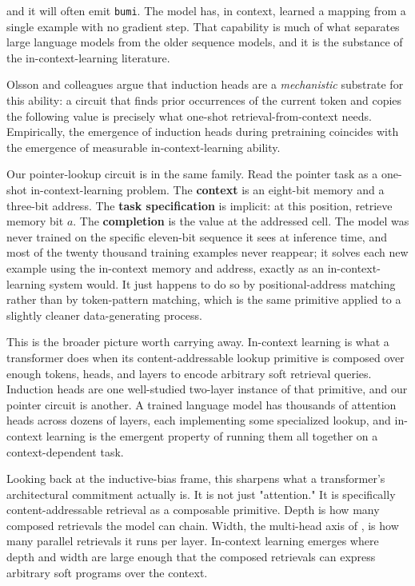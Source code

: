 and it will often emit \texttt{bumi}. The model has, in context, learned a
mapping from a single example with no gradient step. That capability is much of
what separates large language models from the older sequence models, and it is
the substance of the in-context-learning literature.

Olsson and colleagues argue that induction heads are a \emph{mechanistic}
substrate for this ability: a circuit that finds prior occurrences of the current
token and copies the following value is precisely what one-shot
retrieval-from-context needs. Empirically, the emergence of induction heads
during pretraining coincides with the emergence of measurable in-context-learning
ability.

Our pointer-lookup circuit is in the same family. Read the pointer task as a
one-shot in-context-learning problem. The \textbf{context} is an eight-bit memory
and a three-bit address. The \textbf{task specification} is implicit: at this
position, retrieve memory bit $a$. The \textbf{completion} is the value at the
addressed cell. The model was never trained on the specific eleven-bit sequence
it sees at inference time, and most of the twenty thousand training examples
never reappear; it solves each new example using the in-context memory and
address, exactly as an in-context-learning system would. It just happens to do so
by positional-address matching rather than by token-pattern matching, which is
the same primitive applied to a slightly cleaner data-generating process.

This is the broader picture worth carrying away. In-context learning is what a
transformer does when its content-addressable lookup primitive is composed over
enough tokens, heads, and layers to encode arbitrary soft retrieval queries.
Induction heads are one well-studied two-layer instance of that primitive, and
our pointer circuit is another. A trained language model has thousands of
attention heads across dozens of layers, each implementing some specialized
lookup, and in-context learning is the emergent property of running them all
together on a context-dependent task.

Looking back at the inductive-bias frame, this sharpens what a transformer's
architectural commitment actually is. It is not just "attention." It is
specifically content-addressable retrieval as a composable primitive. Depth is
how many composed retrievals the model can chain. Width, the multi-head axis of
, is how many parallel retrievals it runs per layer.
In-context learning emerges where depth and width are large enough that the
composed retrievals can express arbitrary soft programs over the context.

